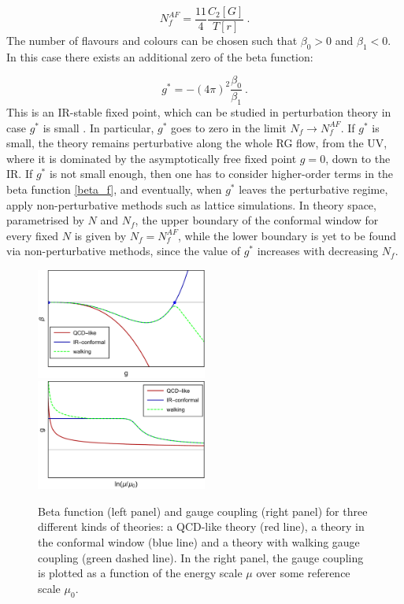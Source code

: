 \begin{equation}
N_f^{AF} = \frac{11}{4} \frac{C_2[G]}{T[r]} \: .
\label{NfAF}
\end{equation}
%
The number of flavours and colours can be chosen such that $\beta_0>0$ and $\beta_1<0$. In this case there exists an additional zero of the beta function:

\begin{equation}
g^* = -(4 \pi)^2 \frac{\beta_0}{\beta_1} \: .
\label{BanksZaks}
\end{equation}
%
This is an IR-stable fixed point, which can be studied in perturbation theory in case $g^*$ is small \cite{Banks:1981nn}. In particular, $g^*$ goes to zero in the limit $N_f \to N_f^{AF}$. If $g^*$ is small, the theory remains perturbative along the whole RG flow, from the UV, where it is dominated by the asymptotically free fixed point $g=0$, down to the IR. If $g^*$ is not small enough, then one has to consider higher-order terms in the beta function \ref{beta_f}, and eventually, when $g^*$ leaves the perturbative regime, apply non-perturbative methods such as lattice simulations. In theory space, parametrised by $N$ and $N_f$, the upper boundary of the conformal window for every fixed $N$ is given by $N_f = N_f^{AF}$, while the lower boundary is yet to be found via non-perturbative methods, since the value of $g^*$ increases with decreasing $N_f$.


\begin{figure}[h!]
\includegraphics[width=0.5\textwidth]{pics/beta_walking}~~~
\includegraphics[width=0.5\textwidth]{pics/g_walking}
\caption{Beta function (left panel) and gauge coupling (right panel) for three different kinds of theories: a QCD-like theory (red line), a theory in the conformal window (blue line) and a theory with walking gauge coupling (green dashed line). In the right panel, the gauge coupling is plotted as a function of the energy scale $\mu$ over some reference scale $\mu_0$.} 
\label{walking}
\end{figure}


